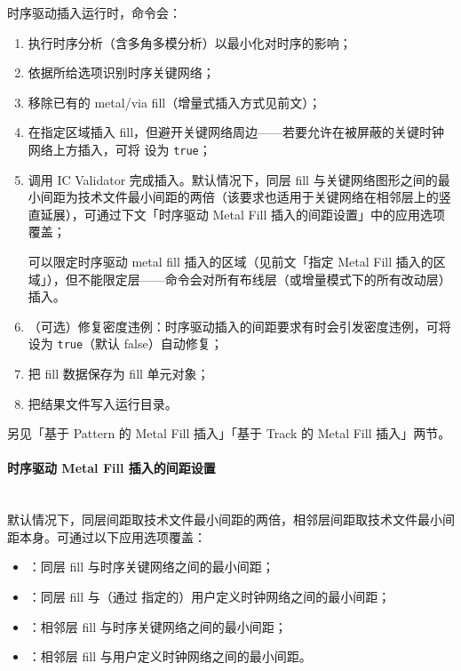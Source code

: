 时序驱动插入运行时，命令会：
\begin{enumerate}
  \item 执行时序分析（含多角多模分析）以最小化对时序的影响；
  \item 依据所给选项识别时序关键网络；
  \item 移除已有的 metal/via fill（增量式插入方式见前文）；
  \item 在指定区域插入 fill，但避开关键网络周边——若要允许在被屏蔽的关键时钟网络上方插入，可将  设为 \texttt{true}；
  \item 调用 IC Validator 完成插入。默认情况下，同层 fill 与关键网络图形之间的最小间距为技术文件最小间距的两倍（该要求也适用于关键网络在相邻层上的竖直延展），可通过下文「时序驱动 Metal Fill 插入的间距设置」中的应用选项覆盖；
        \begin{noteBox}
        可以限定时序驱动 metal fill 插入的区域（见前文「指定 Metal Fill 插入的区域」），但不能限定层——命令会对所有布线层（或增量模式下的所有改动层）插入。
        \end{noteBox}
  \item （可选）修复密度违例：时序驱动插入的间距要求有时会引发密度违例，可将  设为 \texttt{true}（默认 false）自动修复；
  \item 把 fill 数据保存为 fill 单元对象；
  \item 把结果文件写入运行目录。
\end{enumerate}

\begin{seeAlsoBox}
另见「基于 Pattern 的 Metal Fill 插入」「基于 Track 的 Metal Fill 插入」两节。
\end{seeAlsoBox}

\paragraph{时序驱动 Metal Fill 插入的间距设置}
\hfill\\
默认情况下，同层间距取技术文件最小间距的两倍，相邻层间距取技术文件最小间距本身。可通过以下应用选项覆盖：
\begin{itemize}
  \item {}：同层 fill 与时序关键网络之间的最小间距；
  \item {}：同层 fill 与（通过  指定的）用户定义时钟网络之间的最小间距；
  \item {}：相邻层 fill 与时序关键网络之间的最小间距；
  \item {}：相邻层 fill 与用户定义时钟网络之间的最小间距。
\end{itemize}

